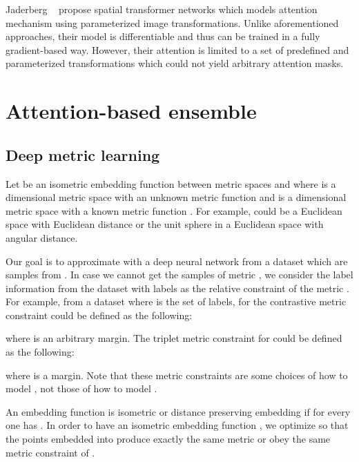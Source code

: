 \documentclass[runningheads]{llncs}
\begin{document}
Jaderberg \etal~\cite{jaderberg2015spatial} propose spatial transformer networks which models attention mechanism using parameterized image transformations.
Unlike aforementioned approaches, their model is differentiable and thus can be trained in a fully gradient-based way.
However, their attention is limited to a set of predefined and parameterized transformations which could not yield arbitrary attention masks.



 
\vspace{-4mm}
\section{Attention-based ensemble}
\label{sec:proposed}
\vspace{-2mm}
\subsection{Deep metric learning}
\vspace{-2mm}

Let  be an isometric embedding function
 between metric spaces  and 
 where  is a  dimensional metric space with an unknown metric function  and
  is a  dimensional metric space with a known metric function .
For example,  could be a Euclidean space with Euclidean distance or the unit sphere in a Euclidean space with angular distance.

Our goal is to approximate  with a deep neural network
 from a dataset 
 which are samples from . In case we cannot get the samples of metric ,
 we consider the label information from the dataset with labels as the relative constraint of the metric .
For example, from a dataset  where  is the set of labels,
     for 
 the contrastive metric constraint could be defined as the following:

where  is an arbitrary margin.
The triplet metric constraint
 for    
 could be defined as the following:
\vspace{-2mm}

 where  is a margin.
Note that these metric constraints are some choices of how to model , not those of how to model .

An embedding function  is isometric or distance preserving embedding if for every  one has .
In order to have an isometric embedding function , 
we optimize  so that the points embedded into  produce exactly the same metric or obey the same metric constraint of .

\vspace{-4mm}
\end{document}
